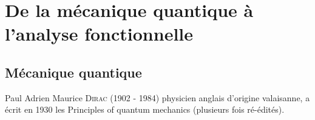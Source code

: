 
\chapter{De la mécanique quantique à l'analyse fonctionnelle}

\section{Mécanique quantique}

 Paul Adrien Maurice \textsc{Dirac} (1902 - 1984) physicien anglais d'origine valaisanne, a écrit en 1930 les
 \og Principles of quantum mechanics\fg{} (plusieurs fois ré-édités).


